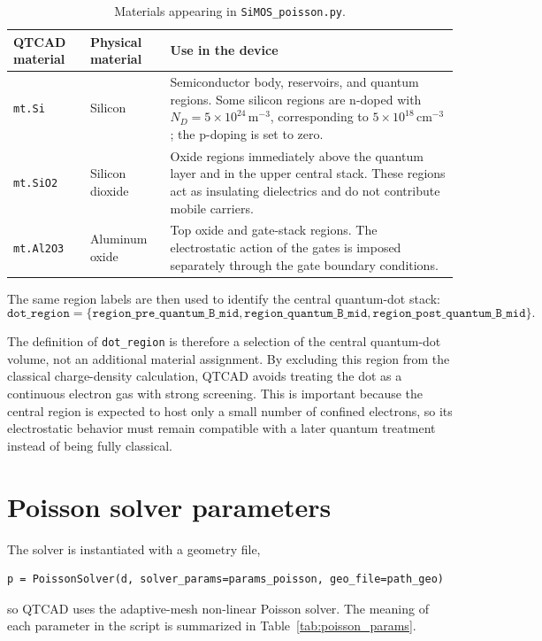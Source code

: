 \begin{table}[H]
\centering
\begin{tabular}{|>{\raggedright\arraybackslash}p{3.0cm}|>{\raggedright\arraybackslash}p{3.0cm}|>{\raggedright\arraybackslash}p{8.0cm}|}
\hline
QTCAD material & Physical material & Use in the device \\
\hline
\texttt{mt.Si} & Silicon & Semiconductor body, reservoirs, and quantum regions. Some silicon regions are n-doped with \(N_D=5\times10^{24}\,\mathrm{m^{-3}}\), corresponding to \(5\times10^{18}\,\mathrm{cm^{-3}}\); the p-doping is set to zero. \\
\hline
\texttt{mt.SiO2} & Silicon dioxide & Oxide regions immediately above the quantum layer and in the upper central stack. These regions act as insulating dielectrics and do not contribute mobile carriers. \\
\hline
\texttt{mt.Al2O3} & Aluminum oxide & Top oxide and gate-stack regions. The electrostatic action of the gates is imposed separately through the gate boundary conditions. \\
\hline
\end{tabular}
\caption{Materials appearing in \texttt{SiMOS\_poisson.py}.}
\label{tab:poisson_materials}
\end{table}

The same region labels are then used to identify the central quantum-dot stack:
\[
\texttt{dot\_region} =
\{\texttt{region\_pre\_quantum\_B\_mid},
\texttt{region\_quantum\_B\_mid},
\texttt{region\_post\_quantum\_B\_mid}\}.
\]

The definition of \texttt{dot\_region} is therefore a selection of the central
quantum-dot volume, not an additional material assignment. By excluding this
region from the classical charge-density calculation, QTCAD avoids treating
the dot as a continuous electron gas with strong screening. This is important
because the central region is expected to host only a small number of confined
electrons, so its electrostatic behavior must remain compatible with a later
quantum treatment instead of being fully classical.

\section{Poisson solver parameters}

The solver is instantiated with a geometry file,
\begin{lstlisting}
p = PoissonSolver(d, solver_params=params_poisson, geo_file=path_geo)
\end{lstlisting}
so QTCAD uses the adaptive-mesh non-linear Poisson solver. The meaning of each
parameter in the script is summarized in Table~\ref{tab:poisson_params}.


